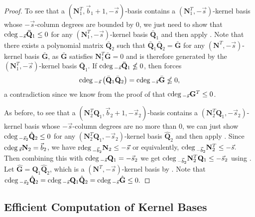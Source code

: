 \begin{proof}
To see that a $\left(\mathbf{N}_{1}^{T},\vec{b}_{1}+1,-\vec{s}\right)$-basis
contains a $\left(\mathbf{N}_{1}^{T},-\vec{s}\right)$-kernel basis
whose $-\vec{s}$-column degrees are bounded by 0, we just need to
show that ${\rm cdeg}\,_{-\vec{s}}\mathbf{\bar{Q}}_{1}\le0$ for any $\left(\mathbf{N}_{1}^{T},-\vec{s}\right)$-kernel
basis $\mathbf{\bar{Q}}_{1}$ and then apply .
Note that there exists a polynomial matrix $\bar{\mathbf{Q}}_{2}$
such that $\mathbf{\bar{Q}}_{1}\mathbf{\bar{Q}}_{2}=\bar{\mathbf{G}}$
for any $\left(\mathbf{N}^{T},-\vec{s}\right)$-kernel basis $\bar{\mathbf{G}}$,
as $\bar{\mathbf{G}}$ satisfies $\mathbf{N}_{1}^{T}\bar{\mathbf{G}}=0$
and is therefore generated by the $\left(\mathbf{N}_{1}^{T},-\vec{s}\right)$-kernel
basis $\bar{\mathbf{Q}}_{1}$. If ${\rm cdeg}\,_{-\vec{s}}\mathbf{\bar{Q}}_{1}\nleq0$,
then  forces 
\[
{\rm cdeg}\,_{-\vec{s}}\left(\bar{\mathbf{Q}}_{1}\bar{\mathbf{Q}}_{2}\right)={\rm cdeg}\,_{-\vec{s}}\bar{\mathbf{G}}\nleq0,
\]
 a contradiction since we know from the proof of 
that ${\rm cdeg}\,_{-\vec{s}}\mathbf{G}^{T}\le0$. 

As before, to see that a $\left(\mathbf{N}_{2}^{T}\mathbf{Q}_{1},\vec{b}_{2}+1,-\vec{s}_{2}\right)$-basis
contains a $\left(\mathbf{N}_{2}^{T}\mathbf{Q}_{1},-\vec{s}_{2}\right)$-kernel
basis whose $-\vec{s}$-column degrees are no more than 0, we can
just show ${\rm cdeg}\,_{-\vec{s}_{2}}\hat{\mathbf{Q}}_{2}\le0$ for any
$\left(\mathbf{N}_{2}^{T}\mathbf{Q}_{1},-\vec{s}_{2}\right)$-kernel
basis $\hat{\mathbf{Q}}_{2}$ and then apply .
Since ${\rm cdeg}\,_{\vec{s}}\mathbf{N}_{2}=\vec{b}_{2}$, we have ${\rm rdeg}\,_{-\vec{b}_{2}}\mathbf{N}_{2}\le-\vec{s}$
or equivalently, ${\rm cdeg}\,_{-\vec{b}_{2}}\mathbf{N}_{2}^{T}\le-\vec{s}.$
Then combining this with ${\rm cdeg}\,_{-\vec{s}}\mathbf{Q}_{1}=-\vec{s}_{2}$
we get ${\rm cdeg}\,_{-\vec{b}_{2}}\mathbf{N}_{2}^{T}\mathbf{Q}_{1}\le-\vec{s}_{2}$
using . Let $\hat{\mathbf{G}}=\mathbf{Q}_{1}\hat{\mathbf{Q}}_{2}$,
which is a $\left(\mathbf{N}^{T},-\vec{s}\right)$-kernel basis by
. Note that ${\rm cdeg}\,_{-\vec{s}_{2}}\hat{\mathbf{Q}}_{2}={\rm cdeg}\,_{-\vec{s}}\mathbf{Q}_{1}\hat{\mathbf{Q}}_{2}={\rm cdeg}\,_{-\vec{s}}\hat{\mathbf{G}}\le0.$
\end{proof}

\subsection{\label{sub:kernelBasisViaOrderBasisByRows}Efficient Computation
of Kernel Bases}

